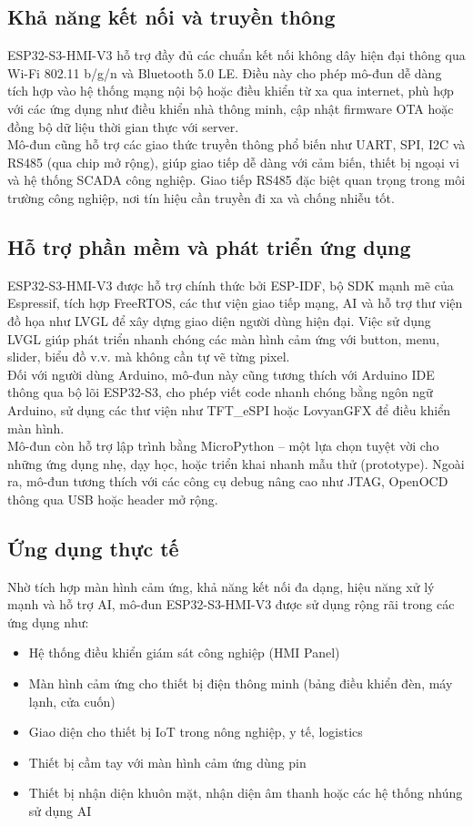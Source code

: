\subsection{Khả năng kết nối và truyền thông} 
\tab ESP32-S3-HMI-V3 hỗ trợ đầy đủ các chuẩn kết nối không dây hiện đại thông qua Wi-Fi 802.11 b/g/n và Bluetooth 5.0 LE. Điều này cho phép mô-đun dễ dàng tích hợp vào hệ thống mạng nội bộ hoặc điều khiển từ xa qua internet, phù hợp với các ứng dụng như điều khiển nhà thông minh, cập nhật firmware OTA hoặc đồng bộ dữ liệu thời gian thực với server.\\
\tab Mô-đun cũng hỗ trợ các giao thức truyền thông phổ biến như UART, SPI, I2C và RS485 (qua chip mở rộng), giúp giao tiếp dễ dàng với cảm biến, thiết bị ngoại vi và hệ thống SCADA công nghiệp. Giao tiếp RS485 đặc biệt quan trọng trong môi trường công nghiệp, nơi tín hiệu cần truyền đi xa và chống nhiễu tốt.
\subsection{Hỗ trợ phần mềm và phát triển ứng dụng} 
\tab ESP32-S3-HMI-V3 được hỗ trợ chính thức bởi ESP-IDF, bộ SDK mạnh mẽ của Espressif, tích hợp FreeRTOS, các thư viện giao tiếp mạng, AI và hỗ trợ thư viện đồ họa như LVGL để xây dựng giao diện người dùng hiện đại. Việc sử dụng LVGL giúp phát triển nhanh chóng các màn hình cảm ứng với button, menu, slider, biểu đồ v.v. mà không cần tự vẽ từng pixel.\\
\tab Đối với người dùng Arduino, mô-đun này cũng tương thích với Arduino IDE thông qua bộ lõi ESP32-S3, cho phép viết code nhanh chóng bằng ngôn ngữ Arduino, sử dụng các thư viện như TFT\_eSPI hoặc LovyanGFX để điều khiển màn hình.\\

\tab Mô-đun còn hỗ trợ lập trình bằng MicroPython – một lựa chọn tuyệt vời cho những ứng dụng nhẹ, dạy học, hoặc triển khai nhanh mẫu thử (prototype). Ngoài ra, mô-đun tương thích với các công cụ debug nâng cao như JTAG, OpenOCD thông qua USB hoặc header mở rộng.
\subsection{Ứng dụng thực tế} 
\tab Nhờ tích hợp màn hình cảm ứng, khả năng kết nối đa dạng, hiệu năng xử lý mạnh và hỗ trợ AI, mô-đun ESP32-S3-HMI-V3 được sử dụng rộng rãi trong các ứng dụng như:
\begin{itemize} 
\item Hệ thống điều khiển giám sát công nghiệp (HMI Panel) 
\item Màn hình cảm ứng cho thiết bị điện thông minh (bảng điều khiển đèn, máy lạnh, cửa cuốn) 
\item Giao diện cho thiết bị IoT trong nông nghiệp, y tế, logistics 
\item Thiết bị cầm tay với màn hình cảm ứng dùng pin 
\item Thiết bị nhận diện khuôn mặt, nhận diện âm thanh hoặc các hệ thống nhúng sử dụng AI 
\end{itemize}
